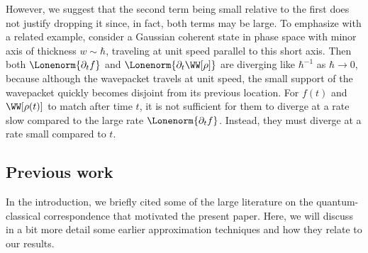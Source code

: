 \documentclass{article}
\numberwithin{equation}{section}
\begin{document}
However, we suggest that the second term being small relative to the first does not justify dropping it since, in fact, both terms may be large.
To emphasize with a related example, consider a Gaussian coherent state in phase space with minor axis of thickness $w \sim \hbar$, traveling at unit speed parallel to this short axis. Then both $\Lonenorm{\partial_t f}$ and $\Lonenorm{\partial_t \WW[\rho]}$ are diverging like $\hbar^{-1}$ as $\hbar \to 0$, because although the wavepacket travels at unit speed, the small support of the wavepacket quickly becomes disjoint from its previous location. For $f(t)$ and $\WW[\rho(t)]$ to match after time $t$, it is not sufficient for them to diverge at a rate slow compared to the large rate $\Lonenorm{\partial_t f}$.  Instead, they must diverge at a rate small compared to $t$.


\subsection{Previous work}
\label{sec:prev-work}



In the introduction, we briefly cited some of the large literature on the quantum-classical correspondence that motivated the present paper.  Here, we will discuss in a bit more detail some  earlier approximation techniques and how they relate to our results.
\end{document}
